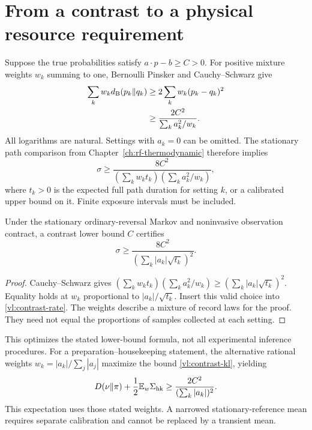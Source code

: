\section{From a contrast to a physical resource requirement}
Suppose the true probabilities satisfy $a\cdot p-b\geq C>0$. For positive
mixture weights $w_k$ summing to one, Bernoulli Pinsker and Cauchy--Schwarz give
\begin{align}
 \sum_k w_k d_{\rm B}(p_k\Vert q_k)
 &\geq2\sum_k w_k(p_k-q_k)^2\\
 &\geq\frac{2C^2}{\sum_k a_k^2/w_k}.
 \label{vl:contrast-kl}
\end{align}
All logarithms are natural. Settings with $a_k=0$ can be omitted. The
stationary path comparison from Chapter~\ref{ch:rf-thermodynamic} therefore
implies
\begin{equation}
 \sigma\geq
 \frac{8C^2}{(\sum_k w_k t_k)(\sum_k a_k^2/w_k)},
 \label{vl:contrast-rate}
\end{equation}
where $t_k>0$ is the expected full path duration for setting $k$, or a
calibrated upper bound on it. Finite exposure intervals must be included.

\begin{proposition}
Under the stationary ordinary-reversal Markov and noninvasive observation
contract, a contrast lower bound $C$ certifies
\begin{equation}
 \boxed{\quad \sigma\geq
 \frac{8C^2}{\left(\sum_k|a_k|\sqrt{t_k}\right)^2}.\quad}
 \label{vl:contrast-optimal-rate}
\end{equation}
\end{proposition}
\begin{proof}
Cauchy--Schwarz gives
$(\sum_k w_kt_k)(\sum_k a_k^2/w_k)
\geq(\sum_k|a_k|\sqrt{t_k})^2$.
Equality holds at $w_k$ proportional to $|a_k|/\sqrt{t_k}$. Insert this valid
choice into \eqref{vl:contrast-rate}. The weights describe a mixture of record
laws for the proof. They need not equal the proportions of samples collected
at each setting.
\end{proof}
This optimizes the stated lower-bound formula, not all experimental inference
procedures. For a preparation--housekeeping statement, the alternative rational
weights $w_k=|a_k|/\sum_j|a_j|$ maximize the bound
\eqref{vl:contrast-kl}, yielding
\[
 D(\nu\Vert\pi)+\frac12\mathbb E_w\Sigma_{\rm hk}
 \geq \frac{2C^2}{(\sum_k|a_k|)^2}.
\]
This expectation uses those stated weights. A narrowed stationary-reference
mean requires separate calibration and cannot be replaced by a transient mean.

